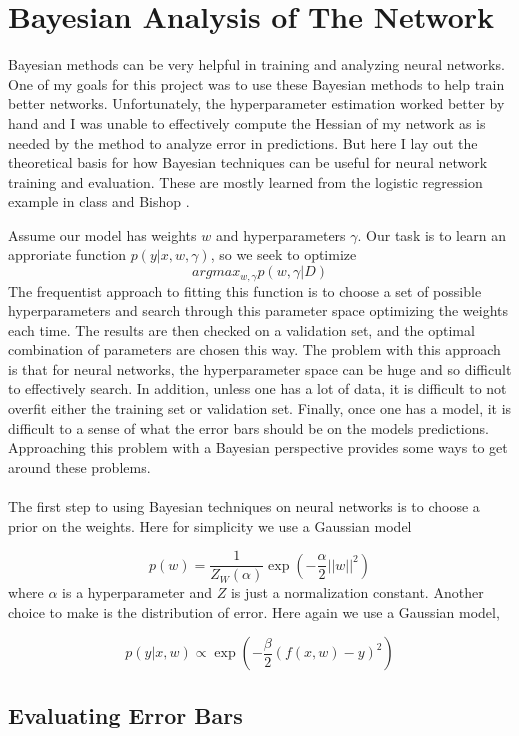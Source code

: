 \documentclass{article}
\begin{document}
\section{Bayesian Analysis of The Network}

Bayesian methods can be very helpful in training and analyzing
neural networks. One of my goals for this project was to use
these Bayesian methods to help train better networks. Unfortunately,
the hyperparameter estimation worked better by hand and I was unable
to effectively compute the Hessian of my network as is needed by the
method to analyze error in predictions. But here I lay out the
theoretical basis for how Bayesian techniques can be useful for
neural network training and evaluation. These are mostly learned
from the logistic regression example in class and Bishop \cite{bishop1995neural}.

Assume our model has weights $w$ and hyperparameters $\gamma$. Our task
is to learn an approriate function $p(y|x, w, \gamma)$, so we seek to
optimize
\[ argmax_{w, \gamma} p(w, \gamma |D) \]
The frequentist approach to fitting this function is to choose a set
of possible hyperparameters and search through this parameter space
optimizing the weights each time. The results are then checked on
a validation set, and the optimal combination of parameters are chosen
this way. The problem with this approach is that for neural networks,
the hyperparameter space can be huge and so difficult
to effectively search. In addition, unless one has a lot of data, it is
difficult to not overfit either the training set or validation set. Finally,
once one has a model, it is difficult to a sense of what the error bars should
be on the models predictions. Approaching this problem with a Bayesian 
perspective provides some ways to get around these problems.\\ \\

The first step to using Bayesian techniques on neural networks is to choose
a prior on the weights. Here for simplicity we use a Gaussian model

\[ p(w) = \frac{1}{Z_W(\alpha)} \exp \left( -\frac{\alpha}{2} ||w||^2  \right) \]
where $\alpha$ is a hyperparameter and $Z$ is just a normalization constant.
Another choice to make is the distribution of error. Here again we use a
Gaussian model,

\[ p(y| x, w) \propto \exp\left( -\frac{\beta}{2} (f(x,w)-y)^2 \right) \]

\subsection{Evaluating Error Bars}
\end{document}
